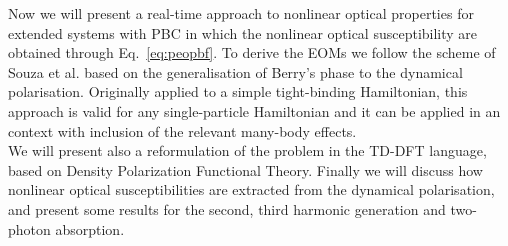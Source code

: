 Now we will present a real-time \ai approach to nonlinear optical properties for extended systems with PBC in which the nonlinear optical susceptibility are obtained through Eq.~\eqref{eq:peopbf}. To derive the EOMs we follow the scheme of Souza et al.\cite{souza_prb} based on the generalisation of Berry's phase to the dynamical polarisation. Originally applied to a simple tight-binding Hamiltonian, this approach is valid for any single-particle Hamiltonian and it can be applied in an \ai context with inclusion of the relevant many-body effects.\\
We will present also a reformulation of the problem in the TD-DFT language, based on Density Polarization Functional Theory. 
Finally we will discuss how nonlinear optical susceptibilities are extracted from the dynamical polarisation, and present some results for the second, third harmonic generation and two-photon absorption. 
   



